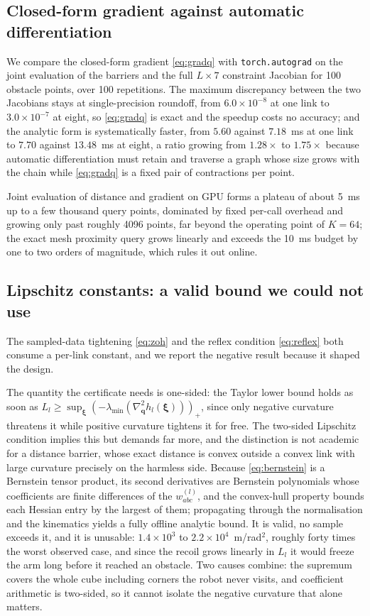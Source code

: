\documentclass[journal]{IEEEtran}
\begin{document}
\subsection{Closed-form gradient against automatic differentiation}\label{subsec:res_autograd}
We compare the closed-form gradient \eqref{eq:gradq} with \texttt{torch.autograd} on the joint evaluation of the barriers and the full $L\times7$ constraint Jacobian for 100 obstacle points, over 100 repetitions. The maximum discrepancy between the two Jacobians stays at single-precision roundoff, from $6.0\times10^{-8}$ at one link to $3.0\times10^{-7}$ at eight, so \eqref{eq:gradq} is exact and the speedup costs no accuracy; and the analytic form is systematically faster, from $5.60$ against $7.18$~ms at one link to $7.70$ against $13.48$~ms at eight, a ratio growing from $1.28\times$ to $1.75\times$ because automatic differentiation must retain and traverse a graph whose size grows with the chain while \eqref{eq:gradq} is a fixed pair of contractions per point.

Joint evaluation of distance and gradient on GPU forms a plateau of about 5~ms up to a few thousand query points, dominated by fixed per-call overhead and growing only past roughly 4096 points, far beyond the operating point of $K=64$; the exact mesh proximity query grows linearly and exceeds the 10~ms budget by one to two orders of magnitude, which rules it out online.


\subsection{Lipschitz constants: a valid bound we could not use}\label{subsec:res_lip}
The sampled-data tightening \eqref{eq:zoh} and the reflex condition \eqref{eq:reflex} both consume a per-link constant, and we report the negative result because it shaped the design.

The quantity the certificate needs is one-sided: the Taylor lower bound holds as soon as $L_l\ge\sup_{\bm\xi}(-\lambda_{\min}(\nabla^2_{\mathbf{q}}h_l(\bm\xi)))_+$, since only negative curvature threatens it while positive curvature tightens it for free. The two-sided Lipschitz condition implies this but demands far more, and the distinction is not academic for a distance barrier, whose exact distance is convex outside a convex link with large curvature precisely on the harmless side. Because \eqref{eq:bernstein} is a Bernstein tensor product, its second derivatives are Bernstein polynomials whose coefficients are finite differences of the $w^{(l)}_{abc}$, and the convex-hull property bounds each Hessian entry by the largest of them; propagating through the normalisation and the kinematics yields a fully offline analytic bound. It is valid, no sample exceeds it, and it is unusable: $1.4\times10^{3}$ to $2.2\times10^{4}$~m/rad$^2$, roughly forty times the worst observed case, and since the recoil grows linearly in $L_l$ it would freeze the arm long before it reached an obstacle. Two causes combine: the supremum covers the whole cube including corners the robot never visits, and coefficient arithmetic is two-sided, so it cannot isolate the negative curvature that alone matters.
\end{document}

